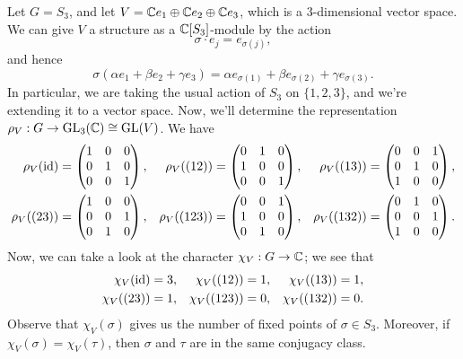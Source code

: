 \begin{exmp}
    Let $G = S_3$, and let $V = \mathbb{C} e_1 \oplus \mathbb{C} e_2 \oplus \mathbb{C} e_3$, which is a 
    $3$-dimensional vector space. We can give $V$ a structure as a 
    $\mathbb{C}[S_3]$-module by the action 
    \[ \sigma \cdot e_j = e_{\sigma(j)}, \] 
    and hence 
    \[ \sigma(\alpha e_1 + \beta e_2 + \gamma e_3) = \alpha e_{\sigma(1)} 
    + \beta e_{\sigma(2)} + \gamma e_{\sigma(3)}. \] 
    In particular, we are taking the usual action of $S_3$ on $\{1, 2, 3\}$, and 
    we're extending it to a vector space. Now, we'll determine the representation
    $\rho_V : G \to \operatorname{GL}_3(\mathbb{C}) \cong \operatorname{GL}(V)$. We have 
    \begin{align*}
        \rho_V(\operatorname{id}) &= \begin{pmatrix} 1&0&0\\0&1&0\\0&0&1 \end{pmatrix}, & 
        \rho_V((12)) &= \begin{pmatrix} 0&1&0\\1&0&0\\0&0&1 \end{pmatrix}, & 
        \rho_V((13)) &= \begin{pmatrix} 0&0&1\\0&1&0\\1&0&0 \end{pmatrix}, \\ 
        \rho_V((23)) &= \begin{pmatrix} 1&0&0\\0&0&1\\0&1&0 \end{pmatrix}, &
        \rho_V((123)) &= \begin{pmatrix} 0&0&1\\1&0&0\\0&1&0 \end{pmatrix}, &
        \rho_V((132)) &= \begin{pmatrix} 0&1&0\\0&0&1\\1&0&0 \end{pmatrix}.
    \end{align*}
    Now, we can take a look at the character $\chi_V : G \to \mathbb{C}$; we see that 
    \begin{align*}
        \chi_V(\operatorname{id}) &= 3, & \chi_V((12)) &= 1, & \chi_V((13)) &= 1, \\ 
        \chi_V((23)) &= 1, & \chi_V((123)) &= 0, & \chi_V((132)) &= 0. 
    \end{align*}
    Observe that $\chi_V(\sigma)$ gives us the number of fixed points of 
    $\sigma \in S_3$. Moreover, if $\chi_V(\sigma) = \chi_V(\tau)$, then 
    $\sigma$ and $\tau$ are in the same conjugacy class. 
\end{exmp}

